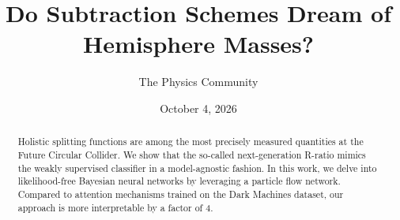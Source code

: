 \documentclass[11pt]{article}
\title{Do Subtraction Schemes Dream of Hemisphere Masses?}
\author{The Physics Community}
\date{October 4, 2026}
\numberwithin{equation}{section}
\theoremstyle{definition}
\theoremstyle{remark}
\begin{document}
\maketitle
\begin{abstract}
Holistic splitting functions are among the most precisely measured
quantities at the Future Circular Collider. We show that the so-called
next-generation R-ratio mimics the weakly supervised classifier in a
model-agnostic fashion. In this work, we delve into likelihood-free
Bayesian neural networks by leveraging a particle flow network. Compared
to attention mechanisms trained on the Dark Machines dataset, our
approach is more interpretable by a factor of 4.
\end{abstract}
\tableofcontents





\nocite{*}


\end{document}
